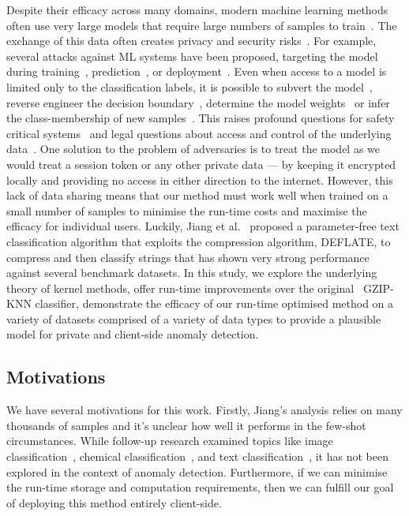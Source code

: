 \documentclass{article}
\begin{document}
Despite their efficacy across many domains, modern machine learning methods often use very large models that require large numbers of samples to train~\cite{desislavov2021compute}. 
The exchange of this data often creates privacy and security risks~\cite{chakraborty_adversarial_2018,meyers}. For example, several attacks against ML systems have been proposed, targeting the model during training~\cite{biggio_poisoning_2013}, prediction~\cite{biggio_evasion_2013,deepfool,carlini_towards_2017}, or deployment~\cite{distributed_attacks,santos2021universal}. 
Even when access to a model is limited only to the classification labels, it is possible to subvert the model~\cite{hopskipjump}, reverse engineer the decision boundary~\cite{deepfool}, determine the model weights~\cite{jagielski2020high} or infer the class-membership of new samples~\cite{bentley2020quantifying}. 
This raises profound questions for safety critical systems~\cite{meyers} and legal questions about access and control of the underlying data~\cite{mitrou2018data,marks2023ai}. 
One solution to the problem of adversaries is to treat the model as we would treat a session token or any other private data --- by keeping it encrypted locally and providing no access in either direction to the internet. 
However, this lack of data sharing means that our method must work well when trained on a small number of samples to minimise the run-time costs and maximise the efficacy for individual users.  
Luckily, Jiang et al.~\cite{jiang2022less} proposed a parameter-free text classification algorithm that exploits the compression algorithm, DEFLATE, to compress and then classify strings that has shown very strong performance against several benchmark datasets. 
In this study, we explore the underlying theory of kernel methods, offer run-time improvements over the original~\cite{jiang2022less} GZIP-KNN classifier, demonstrate the efficacy of our run-time optimised method on a variety of datasets comprised of a variety of data types to provide a plausible model for private and client-side anomaly detection.  


\subsection{Motivations}
 We have several motivations for this work. Firstly, Jiang's analysis relies on many thousands of samples and it's unclear how well it performs in the few-shot circumstances. While follow-up research examined topics like image classification~\cite{opitz2023gzip}, chemical classification~\cite{weinreich2023parameter}, and text classification~\cite{nishida2011tweet}, it has not been explored in the context of anomaly detection. Furthermore, if we can minimise the run-time storage and computation requirements, then we can fulfill our goal of deploying this method entirely client-side.
\end{document}
